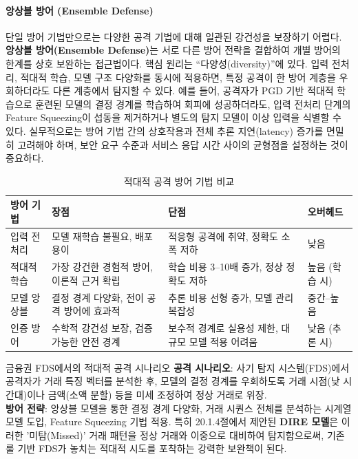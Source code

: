 \paragraph{앙상블 방어 (Ensemble Defense)}

단일 방어 기법만으로는 다양한 공격 기법에 대해 일관된 강건성을 보장하기 어렵다. \textbf{앙상블 방어(Ensemble Defense)}는 서로 다른 방어 전략을 결합하여 개별 방어의 한계를 상호 보완하는 접근법이다. 핵심 원리는 ``다양성(diversity)''에 있다. 입력 전처리, 적대적 학습, 모델 구조 다양화를 동시에 적용하면, 특정 공격이 한 방어 계층을 우회하더라도 다른 계층에서 탐지할 수 있다. 예를 들어, 공격자가 PGD 기반 적대적 학습으로 훈련된 모델의 결정 경계를 학습하여 회피에 성공하더라도, 입력 전처리 단계의 Feature Squeezing이 섭동을 제거하거나 별도의 탐지 모델이 이상 입력을 식별할 수 있다. 실무적으로는 방어 기법 간의 상호작용과 전체 추론 지연(latency) 증가를 면밀히 고려해야 하며, 보안 요구 수준과 서비스 응답 시간 사이의 균형점을 설정하는 것이 중요하다.

\begin{table}[htbp]
\centering
\caption{적대적 공격 방어 기법 비교}
\label{tab:defense_comparison}
\begin{tabularx}{\textwidth}{p{2.2cm}XXp{2cm}}
\toprule
\textbf{방어 기법} & \textbf{장점} & \textbf{단점} & \textbf{오버헤드} \\
\midrule
입력 전처리 & 모델 재학습 불필요, 배포 용이 & 적응형 공격에 취약, 정확도 소폭 저하 & 낮음 \\
적대적 학습 & 가장 강건한 경험적 방어, 이론적 근거 확립 & 학습 비용 3--10배 증가, 정상 정확도 저하 & 높음 (학습 시) \\
모델 앙상블 & 결정 경계 다양화, 전이 공격 방어에 효과적 & 추론 비용 선형 증가, 모델 관리 복잡성 & 중간--높음 \\
인증 방어 & 수학적 강건성 보장, 검증 가능한 안전 경계 & 보수적 경계로 실용성 제한, 대규모 모델 적용 어려움 & 낮음 (추론 시) \\
\bottomrule
\end{tabularx}
\end{table}

\begin{practicaltool}{금융권 FDS에서의 적대적 공격 시나리오}
\textbf{공격 시나리오}: 사기 탐지 시스템(FDS)에서 공격자가 거래 특징 벡터를 분석한 후, 모델의 결정 경계를 우회하도록 거래 시점(낮 시간대)이나 금액(소액 분할) 등을 미세 조정하여 정상 거래로 위장.\\
\textbf{방어 전략}: 앙상블 모델을 통한 결정 경계 다양화, 거래 시퀀스 전체를 분석하는 시계열 모델 도입, Feature Squeezing 기법 적용. 특히 20.1.4절에서 제안된 \textbf{DIRE 모델}은 이러한 '미탐(Missed)' 거래 패턴을 정상 거래와 이중으로 대비하여 탐지함으로써, 기존 룰 기반 FDS가 놓치는 적대적 시도를 포착하는 강력한 보완책이 된다.
\end{practicaltool}

